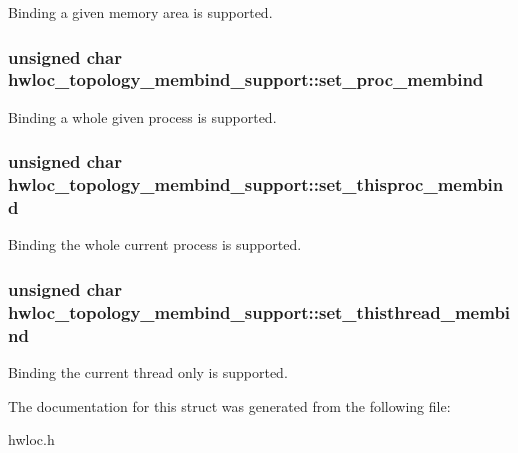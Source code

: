 \label{a00025_a476c06f96b65c08b287cf2369966123b}
Binding a given memory area is supported. \hypertarget{a00025_a756f44912894b176bf979a1b65f12aac}{
\subsubsection[{set\_\-proc\_\-membind}]{\setlength{\rightskip}{0pt plus 5cm}unsigned char {\bf hwloc\_\-topology\_\-membind\_\-support::set\_\-proc\_\-membind}}}
\label{a00025_a756f44912894b176bf979a1b65f12aac}
Binding a whole given process is supported. \hypertarget{a00025_a36b3e388df9c6a249427cab7e3724749}{
\subsubsection[{set\_\-thisproc\_\-membind}]{\setlength{\rightskip}{0pt plus 5cm}unsigned char {\bf hwloc\_\-topology\_\-membind\_\-support::set\_\-thisproc\_\-membind}}}
\label{a00025_a36b3e388df9c6a249427cab7e3724749}
Binding the whole current process is supported. \hypertarget{a00025_a0697af2e41f2e82b8ce71e3cc13f7eac}{
\subsubsection[{set\_\-thisthread\_\-membind}]{\setlength{\rightskip}{0pt plus 5cm}unsigned char {\bf hwloc\_\-topology\_\-membind\_\-support::set\_\-thisthread\_\-membind}}}
\label{a00025_a0697af2e41f2e82b8ce71e3cc13f7eac}
Binding the current thread only is supported. 

The documentation for this struct was generated from the following file:\begin{DoxyCompactItemize}
\item 
hwloc.h\end{DoxyCompactItemize}
